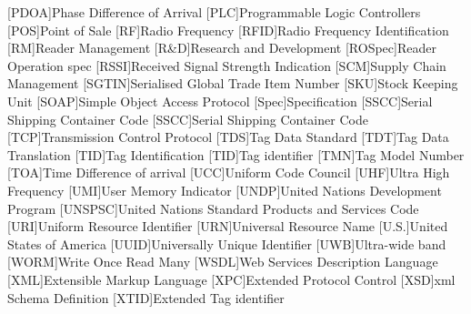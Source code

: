 \begin{multicols}{2}
\begin{acronym}[AAAAAA]
	[PDOA]{Phase Difference of Arrival}
	[PLC]{Programmable Logic Controllers}
	[POS]{Point of Sale}
	[RF]{Radio Frequency}
	[RFID]{Radio Frequency Identification}
	[RM]{Reader Management}
	[R\&D]{Research and Development}
	[ROSpec]{Reader Operation \acs{spec}}
	[RSSI]{Received Signal Strength Indication}
	[SCM]{Supply Chain Management}
	[SGTIN]{Serialised Global Trade Item Number}
	[SKU]{Stock Keeping Unit}
	[SOAP]{Simple Object Access Protocol}
	[Spec]{Specification}
	[SSCC]{Serial Shipping Container Code}
	[SSCC]{Serial Shipping Container Code}
	[TCP]{Transmission Control Protocol}
	[TDS]{Tag Data Standard}
	[TDT]{Tag Data Translation}
	[TID]{Tag Identification}
	[TID]{Tag identifier}
	[TMN]{Tag Model Number}
	[TOA]{Time Difference of arrival}
	[UCC]{Uniform Code Council}
	[UHF]{Ultra High Frequency}
	[UMI]{User Memory Indicator}
	[UNDP]{United Nations Development Program}
	[UNSPSC]{United Nations Standard Products and Services Code}
	[URI]{Uniform Resource Identifier}
	[URN]{Universal Resource Name}
	[U.S.]{United States of America}
	[UUID]{Universally Unique Identifier}
	[UWB]{Ultra-wide band}
	[WORM]{Write Once Read Many}
	[WSDL]{Web Services Description Language}
	[XML]{Extensible Markup Language}
	[XPC]{Extended Protocol Control}
	[XSD]{\acs{xml} Schema Definition}
	[XTID]{Extended Tag identifier}
\end{acronym}
\end{multicols}

